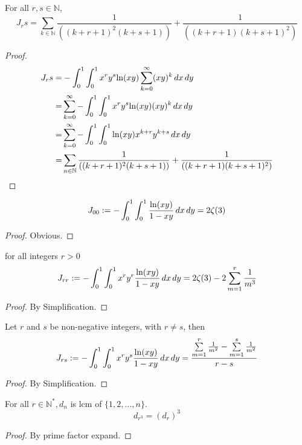 \begin{lemma}\label{J_rs_eq_tsum}
    For all $r,s \in \mathbb{N}$,
    \[ J_rs = \sum_{k \in \mathbb{N}} \frac{1}{((k+r+1)^2(k+s+1))}+\frac{1}{((k+r+1)(k+s+1)^2)}\]
\end{lemma}
\begin{proof}
    \leanok
    \begin{align*}
        J_rs =& -\int_{0}^{1}\int_{0}^{1} x^ry^s{\rm ln}(xy) \sum_{k=0}^{\infty} (xy)^k \, dx \, dy \\
       =& \sum_{k=0}^{\infty} -\int_{0}^{1}\int_{0}^{1} x^ry^s{\rm ln}(xy)(xy)^k \, dx \, dy \\
       =& \sum_{k=0}^{\infty} -\int_{0}^{1}\int_{0}^{1} {\rm ln}(xy)x^{k+r}y^{k+s} \, dx \, dy \\
       =& \sum_{n \in \mathbb{N}} \frac{1}{((k+r+1)^2(k+s+1))}+\frac{1}{((k+r+1)(k+s+1)^2)}
   \end{align*}
\end{proof}

\begin{lemma}\label{integral_zeta_3}
    \[ J_{00} := -\int_{0}^{1}\int_{0}^{1} \frac{{\rm ln}(xy)}{1-xy} \, dx \, dy = 2\zeta(3) \]
\end{lemma}
\begin{proof}
    \leanok
    Obvious.
\end{proof}

\begin{lemma}\label{J_rr}
    for all integers $r > 0$
    \[ J_{rr} := -\int_{0}^{1}\int_{0}^{1} x^ry^r\frac{{\rm ln}(xy)}{1-xy} \, dx \, dy = 2\zeta(3) - 2 \sum\limits_{m = 1}^{r}\frac{1}{m^3} \]
\end{lemma}
\begin{proof}
    \leanok
    By Simplification.
\end{proof}

\begin{lemma}\label{J_rs}
    Let $r$ and $s$ be non-negative integers, with $r \neq s$, then
    \[ J_{rs} := -\int_{0}^{1}\int_{0}^{1} x^ry^s\frac{{\rm ln}(xy)}{1-xy} \, dx \, dy = \frac{\sum\limits_{m = 1}^{r}\frac{1}{m^2} - \sum\limits_{m = 1}^{s}\frac{1}{m^2}}{r - s} \]
\end{lemma}
\begin{proof}
    \leanok
    By Simplification.
\end{proof}

\begin{lemma}\label{d_r_3}
    For all $r \in \mathbb{N}^*, d_n$ is lcm of $\{1, 2, \ldots, n\}.$ 
    \[ d_{r^3} = (d_r)^3 \]
\end{lemma}
\begin{proof}
    \leanok
    By prime factor expand.
\end{proof}


